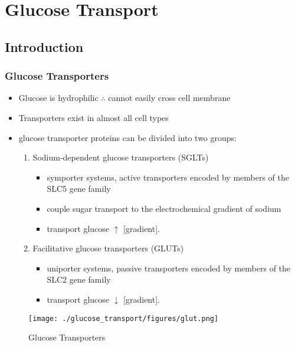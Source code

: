 \documentclass{scrartcl}
\begin{document}
\section{Glucose Transport}
\label{sec:orgafab7ee}
\subsection{Introduction}
\label{sec:orgd20ddb4}
\subsubsection{Glucose Transporters}
\label{sec:orgd945eba}
\begin{itemize}
\item Glucose is hydrophilic \(\therefore\) cannot easily cross cell membrane
\item Transporters exist in almost all cell types
\item glucose transporter proteins can be divided into two groups:
\begin{enumerate}
\item Sodium-dependent glucose transporters (SGLTs)
\begin{itemize}
\item symporter systems, active transporters encoded by members of
the SLC5 gene family
\item couple sugar transport to the electrochemical gradient of sodium
\item transport glucose \(\uparrow\) [gradient].
\end{itemize}
\item Facilitative glucose transporters (GLUTs)
\begin{itemize}
\item uniporter systems, passive transporters encoded by members of the SLC2 gene family
\item transport glucose \(\downarrow\) [gradient].
\end{itemize}
\end{enumerate}
\end{itemize}

\begin{figure}[htbp]
\centering
\texttt{[image: ./glucose\_transport/figures/glut.png]}
\caption[glucose transporters]{\label{fig:orgbe25207}
Glucose Transporters}
\end{figure}
\end{document}
